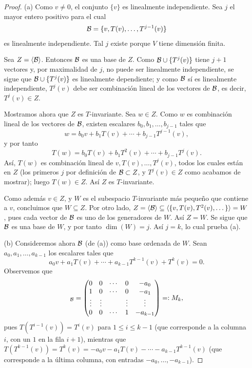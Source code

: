 \documentclass[12pt,a4paper]{book}
\begin{document}
    \begin{proof}
        (a) Como $v\neq 0$, el conjunto $\{v\}$ es linealmente independiente. Sea $j$ el mayor entero positivo para el cual
        \begin{equation*}
            \mathcal{B}=\{v,T(v),\dots,T^{j-1}(v)\}
        \end{equation*}
        es linealmente independiente. Tal $j$ existe porque $V$ tiene dimensión finita.

        Sea $Z=\langle \mathcal{B} \rangle$. Entonces $\mathcal{B}$ es una base de $Z$. Como $\mathcal{B}\cup\{T^j(v)\}$ tiene $j+1$ vectores y, por maximalidad de $j$, no puede ser linealmente independiente, se sigue que $\mathcal{B}\cup\{T^j(v)\}$ es linealmente dependiente; y como $\mathcal{B}$ sí es linealmente independiente, $T^j(v)$ debe ser combinación lineal de los vectores de $\mathcal{B}$, es decir, $T^j(v)\in Z$.

        Mostramos ahora que $Z$ es $T$-invariante. Sea $w\in Z$. Como $w$ es combinación lineal de los vectores de $\mathcal{B}$, existen escalares $b_0,b_1,\dots,b_{j-1}$ tales que
        \begin{equation*}
            w=b_0v+b_1T(v)+\cdots+b_{j-1}T^{j-1}(v),
        \end{equation*}
        y por tanto
        \begin{equation*}
            T(w)=b_0T(v)+b_1T^2(v)+\cdots+b_{j-1}T^j(v).
        \end{equation*}
        Así, $T(w)$ es combinación lineal de $v,T(v),\dots,T^j(v)$, todos los cuales están en $Z$ (los primeros $j$ por definición de $\mathcal{B}\subset Z$, y $T^j(v)\in Z$ como acabamos de mostrar); luego $T(w)\in Z$. Así $Z$ es $T$-invariante.

        Como además $v\in Z$, y $W$ es el subespacio $T$-invariante más pequeño que contiene a $v$, concluimos que $W\subseteq Z$. Por otro lado, $Z=\langle \mathcal{B} \rangle\subseteq\langle \{v,T(v),T^2(v),\dots\} \rangle=W$, pues cada vector de $\mathcal{B}$ es uno de los generadores de $W$. Así $Z=W$. Se sigue que $\mathcal{B}$ es una base de $W$, y por tanto $\dim(W)=j$. Así $j=k$, lo cual prueba (a).

        (b) Consideremos ahora $\mathcal{B}$ (de (a)) como base ordenada de $W$. Sean $a_0,a_1,\dots,a_{k-1}$ los escalares tales que
        \begin{equation*}
            a_0v+a_1T(v)+\cdots+a_{k-1}T^{k-1}(v)+T^k(v)=0.
        \end{equation*}
        Observemos que
        \begin{equation*}
            [T_W]_{\BB}=\begin{pmatrix}0&0&\cdots&0&-a_0\\1&0&\cdots&0&-a_1\\\vdots&\vdots&&\vdots&\vdots\\0&0&\cdots&1&-a_{k-1}\end{pmatrix} =: M_k,
        \end{equation*}
        pues $T(T^{i-1}(v))=T^i(v)$ para $1\leq i\leq k-1$ (que corresponde a la columna $i$, con un $1$ en la fila $i+1$), mientras que $T(T^{k-1}(v))=T^k(v)=-a_0v-a_1T(v)-\cdots-a_{k-1}T^{k-1}(v)$ (que corresponde a la última columna, con entradas $-a_0,\dots,-a_{k-1}$).


\end{proof}
\end{document}

